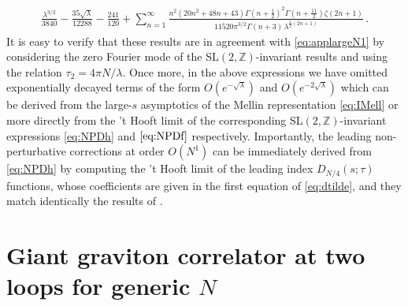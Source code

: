 \documentclass[aps,prl,twocolumn, longbibliography,footinbib,superscriptaddress, preprintnumbers]{revtex4-1}
\newcommand{\<}{\langle}
\renewcommand{\>}{\rangle}
\begin{document}
{\begin{align}
 \frac{\lambda ^{3/2}}{3840} -\frac{35 \sqrt{\lambda }}{12288}  -\frac{241}{120}+ \sum_{n=1}^{\infty}\frac{n^2 (20 n^2{+}48 n{+}43)  \Gamma
   \left(n+\frac{1}{2}\right)^2 \Gamma \left(n{+}\frac{11}{2}\right) \zeta (2 n{+}1)}{11520 \pi ^{3/2} \Gamma
   (n{+}3) \, \lambda ^{\frac{1}{2} (2 n+1)} }\, .
\end{align}
It is easy to verify that these results are in agreement with \eqref{eq:applargeN1}  by considering the zero Fourier mode of the SL$(2, \mathbb{Z})$-invariant results and using the relation $\tau_2 = 4\pi N/ \lambda$.
Once more, in the above expressions we have omitted exponentially decayed terms of the form $O(e^{-\sqrt{\lambda}})$ and $O(e^{-2\sqrt{\lambda}})$ which can be derived from the large-$s$ asymptotics of the Mellin representation \eqref{eq:IMell} or more directly from the 't Hooft limit of the corresponding SL$(2, \mathbb{Z})$-invariant expressions \eqref{eq:NPDh} and $\eqref{eq:NPDf}$ respectively.
Importantly, the leading non-perturbative corrections at order $O(N^1)$ can be immediately derived from \eqref{eq:NPDh} by computing the 't Hooft limit of the leading index $D_{N/4}(s;\tau)$ functions, whose coefficients are given in the first equation of \eqref{eq:dtilde}, and they match identically the results of \cite{Brown:2025huy}.


\section{Giant graviton correlator at two loops  for generic $N$} \label{app:twoloops}

}
\end{document}

